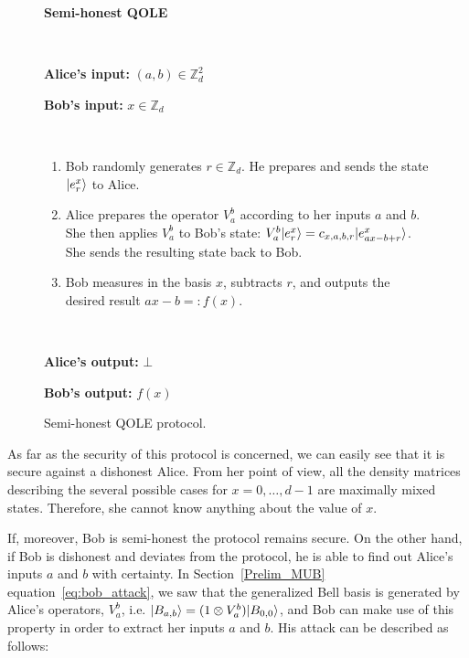 \begin{figure}[h!]
    \centering
        \begin{tcolorbox}
            
            \centerline{\textbf{Semi-honest QOLE}}
            
            \
            
    		\textbf{Alice's input:} $(a, b) \in \mathbb{Z}^2_d$
    
    		\textbf{Bob's input:} $x \in\mathbb{Z}_d$
            
            \
            
		\begin{enumerate}
        \item Bob  randomly generates $r \in \mathbb{Z}_d$. He prepares and sends the state $| e^x_r \rangle$ to Alice.
        \item Alice prepares the operator $V^b_a$ according to her inputs $a$ and $b$. She then applies $V^b_a$ to Bob's state: $V^b_a | e^x_r \rangle = c_{x,a,b,r} | e^x_{ax - b + r} \rangle$. She sends the resulting state back to Bob. 
        \item Bob measures in the  basis  $x$,  subtracts $r$, and outputs the desired result $ax-b=:f(x)$.
    \end{enumerate}
    
    \
    
    \textbf{Alice's output:} $\bot$
    
    \textbf{Bob's output:} $f(x)$
        
        \end{tcolorbox}
    \caption{Semi-honest QOLE protocol.}
    \label{fig:SH_QOLE}
\end{figure}



As far as the security of this protocol is concerned, we can easily see that it is secure against a dishonest Alice.  From her point of view, all the density matrices describing the several possible cases for $x = 0, \ldots, d-1$  are maximally mixed states. Therefore, she cannot know anything about the value of $x$. 

If, moreover, Bob is semi-honest the protocol remains secure. On the other hand, if Bob is dishonest and deviates from the protocol, he is able to find out Alice's inputs $a$ and $b$ with certainty. %
In Section~\ref{Prelim_MUB} equation~\eqref{eq:bob_attack}, we saw that the generalized Bell basis is generated by Alice's operators, $V^b_a$, i.e. $ | B_{a,b} \rangle = (1 \otimes V^b_a) | B_{0,0} \rangle $,  and Bob can make use of this property in order to extract her inputs $a$ and $b$. His attack can be described as follows:

